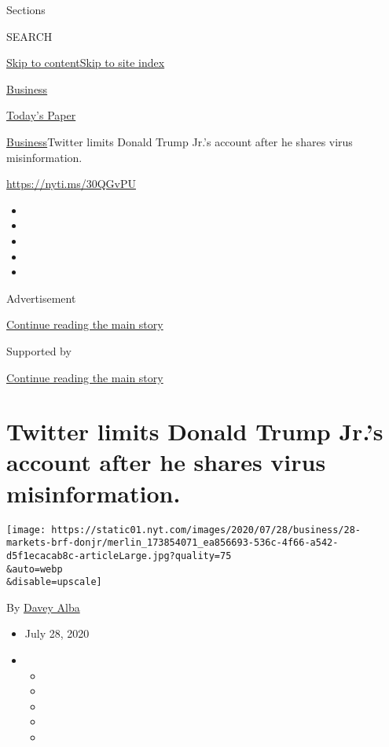 Sections

SEARCH

\protect\hyperlink{site-content}{Skip to
content}\protect\hyperlink{site-index}{Skip to site index}

\href{https://www.nytimes.com/section/business}{Business}

\href{https://myaccount.nytimes.com/auth/login?response_type=cookie\&client_id=vi}{}

\href{https://www.nytimes.com/section/todayspaper}{Today's Paper}

\href{/section/business}{Business}\textbar{}Twitter limits Donald Trump
Jr.'s account after he shares virus misinformation.

\url{https://nyti.ms/30QGvPU}

\begin{itemize}
\item
\item
\item
\item
\item
\end{itemize}

Advertisement

\protect\hyperlink{after-top}{Continue reading the main story}

Supported by

\protect\hyperlink{after-sponsor}{Continue reading the main story}

\hypertarget{twitter-limits-donald-trump-jrs-account-after-he-shares-virus-misinformation}{%
\section{Twitter limits Donald Trump Jr.'s account after he shares virus
misinformation.}\label{twitter-limits-donald-trump-jrs-account-after-he-shares-virus-misinformation}}

\texttt{[image: https://static01.nyt.com/images/2020/07/28/business/28-markets-brf-donjr/merlin\_173854071\_ea856693-536c-4f66-a542-d5f1ecacab8c-articleLarge.jpg?quality=75\\\&auto=webp\\\&disable=upscale]}

By \href{https://www.nytimes.com/by/davey-alba}{Davey Alba}

\begin{itemize}
\item
  July 28, 2020
\item
  \begin{itemize}
  \item
  \item
  \item
  \item
  \item
  \end{itemize}
\end{itemize}

